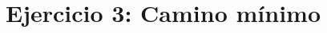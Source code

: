 \documentclass[../main.tex]{subfiles}
\begin{document}
\section{Ejercicio 3: Camino mínimo}
\label{sec:ej3}
\end{document}
